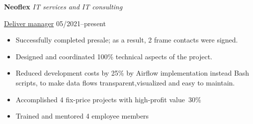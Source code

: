 \textbf{Neoflex} \textit{IT services and IT consulting} \par
\underline{Deliver manager} \hfill 05/2021--present
\begin{itemize}
	\item Successfully completed presale; as a result, 2 frame contacts were signed.
 	\item Designed and coordinated 100\% technical aspects of the project.
 	\item Reduced development costs by 25\% by Airflow implementation instead Bash scripts,  to make data flows transparent,visualized and easy to maintain.
	\item Accomplished 4 fix-price projects with high-profit value~30\%
 	\item Trained and mentored 4 employee members
\end{itemize}\par
